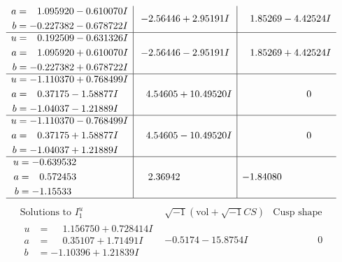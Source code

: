 \documentclass[1p]{elsarticle_modified}
\theoremstyle{definition}
\newcommand{\I}{\sqrt{-1}}
\begin{document}
$$\begin{array}{c|c|c}
\begin{aligned}
a &= \phantom{-}1.095920 - 0.610070 I \\
b &= -0.227382 - 0.678722 I\end{aligned}
 & -2.56446 + 2.95191 I & \phantom{-}1.85269 - 4.42524 I \\ \hline\begin{aligned}
u &= \phantom{-}0.192509 - 0.631326 I \\
a &= \phantom{-}1.095920 + 0.610070 I \\
b &= -0.227382 + 0.678722 I\end{aligned}
 & -2.56446 - 2.95191 I & \phantom{-}1.85269 + 4.42524 I \\ \hline\begin{aligned}
u &= -1.110370 + 0.768499 I \\
a &= \phantom{-}0.37175 - 1.58877 I \\
b &= -1.04037 - 1.21889 I\end{aligned}
 & \phantom{-}4.54605 + 10.49520 I & \phantom{-0.000000 } 0 \\ \hline\begin{aligned}
u &= -1.110370 - 0.768499 I \\
a &= \phantom{-}0.37175 + 1.58877 I \\
b &= -1.04037 + 1.21889 I\end{aligned}
 & \phantom{-}4.54605 - 10.49520 I & \phantom{-0.000000 } 0 \\ \hline\begin{aligned}
u &= -0.639532\phantom{ +0.000000I} \\
a &= \phantom{-}0.572453\phantom{ +0.000000I} \\
b &= -1.15533\phantom{ +0.000000I}\end{aligned}
 & \phantom{-}2.36942\phantom{ +0.000000I} & -1.84080\phantom{ +0.000000I}\\
 \hline 
 \end{array}$$\newpage$$\begin{array}{c|c|c}  
\text{Solutions to }I^u_{1}& \I (\text{vol} + \sqrt{-1}CS) & \text{Cusp shape}\\
 \hline 
\begin{aligned}
u &= \phantom{-}1.156750 + 0.728414 I \\
a &= \phantom{-}0.35107 + 1.71491 I \\
b &= -1.10396 + 1.21839 I\end{aligned}
 & -0.5174 - 15.8754 I & \phantom{-0.000000 } 0 \\ \hline\begin{aligned}

\end{aligned}
\end{array}$$
\end{document}
